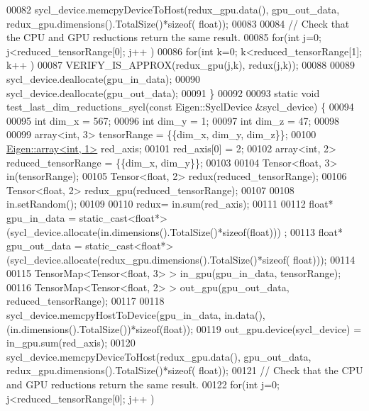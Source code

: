 \begin{DoxyCode}
00082   sycl\_device.memcpyDeviceToHost(redux\_gpu.data(), gpu\_out\_data, redux\_gpu.dimensions().TotalSize()*\textcolor{keyword}{sizeof}(
      float));
00083 
00084   \textcolor{comment}{// Check that the CPU and GPU reductions return the same result.}
00085   \textcolor{keywordflow}{for}(\textcolor{keywordtype}{int} j=0; j<reduced\_tensorRange[0]; j++ )
00086     \textcolor{keywordflow}{for}(\textcolor{keywordtype}{int} k=0; k<reduced\_tensorRange[1]; k++ )
00087       VERIFY\_IS\_APPROX(redux\_gpu(j,k), redux(j,k));
00088 
00089   sycl\_device.deallocate(gpu\_in\_data);
00090   sycl\_device.deallocate(gpu\_out\_data);
00091 \}
00092 
00093 \textcolor{keyword}{static} \textcolor{keywordtype}{void} test\_last\_dim\_reductions\_sycl(\textcolor{keyword}{const} Eigen::SyclDevice &sycl\_device) \{
00094 
00095   \textcolor{keywordtype}{int} dim\_x = 567;
00096   \textcolor{keywordtype}{int} dim\_y = 1;
00097   \textcolor{keywordtype}{int} dim\_z = 47;
00098 
00099   array<int, 3> tensorRange = \{\{dim\_x, dim\_y, dim\_z\}\};
00100   \hyperlink{class_eigen_1_1array}{Eigen::array<int, 1>} red\_axis;
00101   red\_axis[0] = 2;
00102   array<int, 2> reduced\_tensorRange = \{\{dim\_x, dim\_y\}\};
00103 
00104   Tensor<float, 3> in(tensorRange);
00105   Tensor<float, 2> redux(reduced\_tensorRange);
00106   Tensor<float, 2> redux\_gpu(reduced\_tensorRange);
00107 
00108   in.setRandom();
00109 
00110   redux= in.sum(red\_axis);
00111 
00112   \textcolor{keywordtype}{float}* gpu\_in\_data = \textcolor{keyword}{static\_cast<}\textcolor{keywordtype}{float}*\textcolor{keyword}{>}(sycl\_device.allocate(in.dimensions().TotalSize()*\textcolor{keyword}{sizeof}(float)))
      ;
00113   \textcolor{keywordtype}{float}* gpu\_out\_data = \textcolor{keyword}{static\_cast<}\textcolor{keywordtype}{float}*\textcolor{keyword}{>}(sycl\_device.allocate(redux\_gpu.dimensions().TotalSize()*\textcolor{keyword}{sizeof}(
      float)));
00114 
00115   TensorMap<Tensor<float, 3> >  in\_gpu(gpu\_in\_data, tensorRange);
00116   TensorMap<Tensor<float, 2> >  out\_gpu(gpu\_out\_data, reduced\_tensorRange);
00117 
00118   sycl\_device.memcpyHostToDevice(gpu\_in\_data, in.data(),(in.dimensions().TotalSize())*\textcolor{keyword}{sizeof}(\textcolor{keywordtype}{float}));
00119   out\_gpu.device(sycl\_device) = in\_gpu.sum(red\_axis);
00120   sycl\_device.memcpyDeviceToHost(redux\_gpu.data(), gpu\_out\_data, redux\_gpu.dimensions().TotalSize()*\textcolor{keyword}{sizeof}(
      float));
00121   \textcolor{comment}{// Check that the CPU and GPU reductions return the same result.}
00122   \textcolor{keywordflow}{for}(\textcolor{keywordtype}{int} j=0; j<reduced\_tensorRange[0]; j++ )

\end{DoxyCode}
